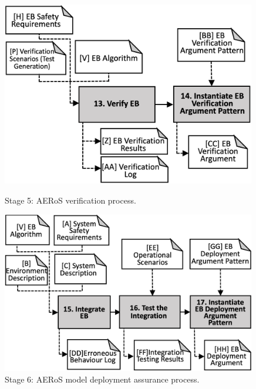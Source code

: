 \documentclass[runningheads]{llncs}
\begin{document}
\begin{figure}[!t]
	\centering
	\begin{minipage}{.5\textwidth}
		\centering
		\includegraphics[width=0.99\textwidth]{figures/AMLAS-STAGE-5-V4.png}%
		\vspace{-2ex}
		\caption{Stage 5: AERoS verification process.}
		\label{amlas-a-stage5}
	\end{minipage}%
	\begin{minipage}{.5\textwidth}
		\centering
		\includegraphics[width=0.99\textwidth]{figures/AMLAS-STAGE-6-V5.png}%
		\vspace{-2ex}
		\caption{Stage 6: AERoS model deployment assurance process.}
		\label{amlas-a-stage6}
	\end{minipage}
	\vspace{-4ex}
\end{figure}
\end{document}
